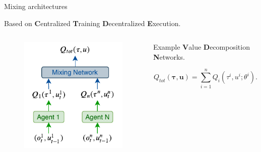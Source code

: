\documentclass{beamer}
\begin{document}
    \begin{frame}{Mixing architectures}

        Based on \textbf{C}entralized \textbf{T}raining \textbf{D}ecentralized \textbf{E}xecution.

        \begin{columns}
            \pause
            \begin{column}{0.5\textwidth}
                \begin{figure}
                    \includegraphics[width=\linewidth]{img/mixing_network.pdf}
                \end{figure}
            \end{column}
            \pause
            \begin{column}{0.5\textwidth}  %
                \begin{block}{Example}
                    \textbf{V}alue \textbf{D}ecomposition \textbf{N}etworks.

                    \begin{equation}
                        Q_{tot}(\boldsymbol{\tau}, \mathbf{u}) = \sum_{i=1}^n Q_i (\tau^i, u^i;\theta^i)\nonumber.
                    \end{equation}
                \end{block}
            \end{column}
        \end{columns}

    \end{frame}
\end{document}
